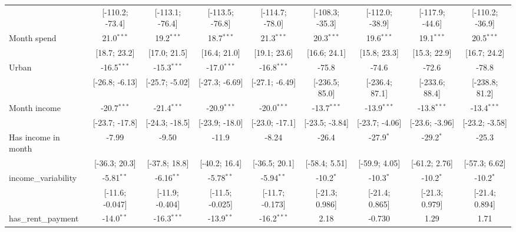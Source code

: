\begin{table}[htbp]
\begin{threeparttable}[b]
\begin{tabular}{lcccccccc}
                                  & [-110.2; -73.4] & [-113.1; -76.4] & [-113.5; -76.8] & [-114.7; -78.0] & [-108.3; -35.3] & [-112.0; -38.9] & [-117.9; -44.6] & [-110.2; -36.9]\\   
         Month spend              & 21.0$^{***}$    & 19.2$^{***}$    & 18.7$^{***}$    & 21.3$^{***}$    & 20.3$^{***}$    & 19.6$^{***}$    & 19.1$^{***}$    & 20.5$^{***}$\\   
                                  & [18.7; 23.2]    & [17.0; 21.5]    & [16.4; 21.0]    & [19.1; 23.6]    & [16.6; 24.1]    & [15.8; 23.3]    & [15.3; 22.9]    & [16.7; 24.2]\\   
         Urban                    & -16.5$^{***}$   & -15.3$^{***}$   & -17.0$^{***}$   & -16.8$^{***}$   & -75.8           & -74.6           & -72.6           & -78.8\\   
                                  & [-26.8; -6.13]  & [-25.7; -5.02]  & [-27.3; -6.69]  & [-27.1; -6.49]  & [-236.5; 85.0]  & [-236.4; 87.1]  & [-233.6; 88.4]  & [-238.8; 81.2]\\   
         Month income             & -20.7$^{***}$   & -21.4$^{***}$   & -20.9$^{***}$   & -20.0$^{***}$   & -13.7$^{***}$   & -13.9$^{***}$   & -13.8$^{***}$   & -13.4$^{***}$\\   
                                  & [-23.7; -17.8]  & [-24.3; -18.5]  & [-23.9; -18.0]  & [-23.0; -17.1]  & [-23.5; -3.84]  & [-23.7; -4.06]  & [-23.6; -3.96]  & [-23.2; -3.58]\\   
         Has income in month      & -7.99           & -9.50           & -11.9           & -8.24           & -26.4           & -27.9$^{*}$     & -29.2$^{*}$     & -25.3\\   
                                  & [-36.3; 20.3]   & [-37.8; 18.8]   & [-40.2; 16.4]   & [-36.5; 20.1]   & [-58.4; 5.51]   & [-59.9; 4.05]   & [-61.2; 2.76]   & [-57.3; 6.62]\\   
         income\_variability      & -5.81$^{**}$    & -6.16$^{**}$    & -5.78$^{**}$    & -5.94$^{**}$    & -10.2$^{*}$     & -10.3$^{*}$     & -10.2$^{*}$     & -10.2$^{*}$\\   
                                  & [-11.6; -0.047] & [-11.9; -0.404] & [-11.5; -0.025] & [-11.7; -0.173] & [-21.3; 0.986]  & [-21.4; 0.865]  & [-21.3; 0.979]  & [-21.4; 0.894]\\   
         has\_rent\_payment       & -14.0$^{**}$    & -16.3$^{***}$   & -13.9$^{**}$    & -16.2$^{***}$   & 2.18            & -0.730          & 1.29            & 1.71\\   

\end{tabular}
\end{threeparttable}
\end{table}
